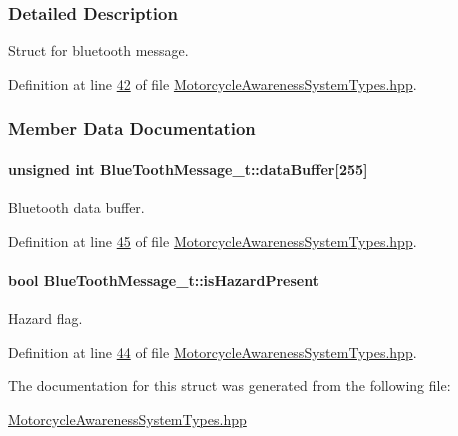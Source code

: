 \subsubsection{Detailed Description}
Struct for bluetooth message. 

Definition at line \hyperlink{MotorcycleAwarenessSystemTypes_8hpp_source_l00042}{42} of file \hyperlink{MotorcycleAwarenessSystemTypes_8hpp_source}{Motorcycle\-Awareness\-System\-Types.\-hpp}.



\subsubsection{Member Data Documentation}
\hypertarget{structBlueToothMessage__t_ab872789a32f068dae8bcf77122256b78}{
\paragraph[{data\-Buffer}]{\setlength{\rightskip}{0pt plus 5cm}unsigned int Blue\-Tooth\-Message\-\_\-t\-::data\-Buffer\mbox{[}255\mbox{]}}}\label{structBlueToothMessage__t_ab872789a32f068dae8bcf77122256b78}


Bluetooth data buffer. 



Definition at line \hyperlink{MotorcycleAwarenessSystemTypes_8hpp_source_l00045}{45} of file \hyperlink{MotorcycleAwarenessSystemTypes_8hpp_source}{Motorcycle\-Awareness\-System\-Types.\-hpp}.

\hypertarget{structBlueToothMessage__t_a2dd315aa1cba1d2d3045e26b9f171e61}{
\paragraph[{is\-Hazard\-Present}]{\setlength{\rightskip}{0pt plus 5cm}bool Blue\-Tooth\-Message\-\_\-t\-::is\-Hazard\-Present}}\label{structBlueToothMessage__t_a2dd315aa1cba1d2d3045e26b9f171e61}


Hazard flag. 



Definition at line \hyperlink{MotorcycleAwarenessSystemTypes_8hpp_source_l00044}{44} of file \hyperlink{MotorcycleAwarenessSystemTypes_8hpp_source}{Motorcycle\-Awareness\-System\-Types.\-hpp}.



The documentation for this struct was generated from the following file\-:\begin{DoxyCompactItemize}
\item 
\hyperlink{MotorcycleAwarenessSystemTypes_8hpp}{Motorcycle\-Awareness\-System\-Types.\-hpp}\end{DoxyCompactItemize}
